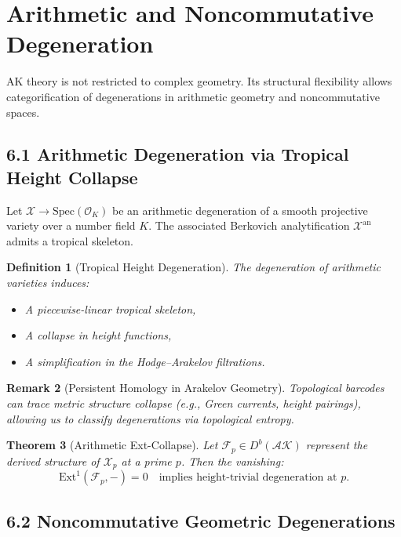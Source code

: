 \documentclass[11pt]{article}
\newtheorem{theorem}{Theorem}[section]
\newtheorem{definition}[theorem]{Definition}
\newtheorem{remark}[theorem]{Remark}
\begin{document}
\section{Arithmetic and Noncommutative Degeneration}

AK theory is not restricted to complex geometry. Its structural flexibility allows categorification of degenerations in arithmetic geometry and noncommutative spaces.

\subsection{6.1 Arithmetic Degeneration via Tropical Height Collapse}

Let \( \mathcal{X} \to \mathrm{Spec}(\mathcal{O}_K) \) be an arithmetic degeneration of a smooth projective variety over a number field \( K \).  
The associated Berkovich analytification \( \mathcal{X}^{\mathrm{an}} \) admits a tropical skeleton.

\begin{definition}[Tropical Height Degeneration]
The degeneration of arithmetic varieties induces:
\begin{itemize}
    \item A piecewise-linear tropical skeleton,
    \item A collapse in height functions,
    \item A simplification in the Hodge–Arakelov filtrations.
\end{itemize}
\end{definition}

\begin{remark}[Persistent Homology in Arakelov Geometry]
Topological barcodes can trace metric structure collapse (e.g., Green currents, height pairings), allowing us to classify degenerations via topological entropy.
\end{remark}

\begin{theorem}[Arithmetic Ext-Collapse]
Let \( \mathcal{F}_p \in D^b(\mathcal{AK}) \) represent the derived structure of \( \mathcal{X}_p \) at a prime \( p \).  
Then the vanishing:
\[
\mathrm{Ext}^1(\mathcal{F}_p, -) = 0 \quad \text{implies height-trivial degeneration at } p.
\]
\end{theorem}

\subsection{6.2 Noncommutative Geometric Degenerations}
\end{document}
